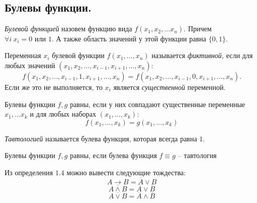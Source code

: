\subsection{Булевы функции.}

\begin{definition}
    \textit{Булевой функцией} назовем функцию вида $f(x_1, x_2, \dots x_n).$ 
    Причем
    $\forall i \ x_i = 0 \text{ или } 1.$ А также область значений у этой функции равна $\{ 0, 1 \}.$
\end{definition}

\begin{definition}
    Переменная $x_i$ булевой функции $f(x_1, \dots, x_n)$ называется \textit{фиктивной,} если для любых значений $(x_1, x_2, \dots, x_{i - 1}, x_{i + 1}, \dots, x_n):$
    $$f(x_1, x_2, \dots, x_{i - 1}, 1, x_{i + 1}, \dots, x_n) = f(x_1, x_2, \dots, x_{i - 1}, 0, x_{i + 1}, \dots, x_n). $$ 
    Если же это не выполняется, то $x_i$ является \textit{существенной} переменной.
\end{definition}

\begin{definition}
    Булевы функции $f, g$ равны, если у них совпадают существенные переменные $x_1, \dots x_k$ и для любых наборах $(x_1, \dots, x_k):$
    $$f(x_1, \dots, x_k) = g(x_1, \dots, x_k)$$
\end{definition}

\begin{definition}
    \textit{Тавтологией} называется булева функция, которая всегда равна $1.$
\end{definition}

\begin{definition}
    Булевы функции $f, g$ равны, если булева функция $f \equiv g$ -- тавтология
\end{definition}

Из определения $1.4$ можно вывести следующие тождества:
$$A \rightarrow B = \overline{A} \vee B$$
$$\overline{A \wedge B} = \overline{A} \vee \overline{B}$$
$$\overline{A \vee B} = \overline{A} \wedge \overline{B}$$